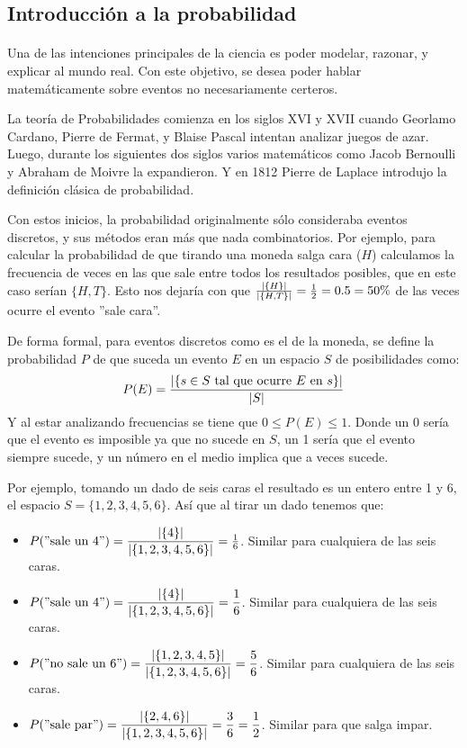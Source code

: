 \documentclass[../main.tex]{subfiles}
\begin{document}
\subsection{Introducción a la probabilidad}

\paragraph{} Una de las intenciones principales de la ciencia es poder modelar, razonar, y explicar al mundo real. Con este objetivo, se desea poder hablar matemáticamente sobre eventos no necesariamente certeros.

La teoría de Probabilidades comienza en los siglos XVI y XVII cuando Georlamo Cardano, Pierre de Fermat, y Blaise Pascal intentan analizar juegos de azar. Luego, durante los siguientes dos siglos varios matemáticos como Jacob Bernoulli y Abraham de Moivre la expandieron. Y en 1812 Pierre de Laplace introdujo la definición clásica de probabilidad.

Con estos inicios, la probabilidad originalmente sólo consideraba eventos discretos, y sus métodos eran más que nada combinatorios. Por ejemplo, para calcular la probabilidad de que tirando una moneda salga cara (\(H\)) calculamos la frecuencia de veces en las que sale entre todos los resultados posibles, que en este caso serían \(\{H, T\}\). Esto nos dejaría con que \(\frac{|\{H\}|}{|\{H, T\}|} = \frac{1}{2} = 0.5 = 50\%\) de las veces ocurre el evento ''sale cara''.

De forma formal, para eventos discretos como es el de la moneda, se define la probabilidad \(P\) de que suceda un evento \(E\) en un espacio \(S\) de posibilidades como:
\begin{gather*}
  P(E) = \frac{|\{s \in S \text{ tal que ocurre } E \text{ en } s\}|}{|S|}
\end{gather*}
Y al estar analizando frecuencias se tiene que \(0 \leq P(E) \leq 1\). Donde un 0 sería que el evento es imposible ya que no sucede en \(S\), un 1 sería que el evento siempre sucede, y un número en el medio implica que a veces sucede.

Por ejemplo, tomando un dado de seis caras el resultado es un entero entre 1 y 6, el espacio \(S = \{1, 2, 3, 4, 5, 6\}\). Así que al tirar un dado tenemos que:
\begin{itemize}
  \item \(P(\text{''sale un 4''}) = \dfrac{|\{4\}|}{|\{1, 2, 3, 4, 5, 6\}|} = \frac{1}{6}\). Similar para cualquiera de las seis caras.
  \item \(P(\text{''sale un 4''}) = \dfrac{|\{4\}|}{|\{1, 2, 3, 4, 5, 6\}|} = \dfrac{1}{6}\). Similar para cualquiera de las seis caras.
  \item \(P(\text{''no sale un 6''}) = \dfrac{|\{1, 2, 3, 4, 5\}|}{|\{1, 2, 3, 4, 5, 6\}|} = \dfrac{5}{6}\). Similar para cualquiera de las seis caras.
\item \(P(\text{''sale par''}) = \dfrac{|\{2, 4, 6\}|}{|\{1, 2, 3, 4, 5, 6\}|} = \dfrac{3}{6} = \dfrac{1}{2}\). Similar para que salga impar.
\end{itemize}
\end{document}
